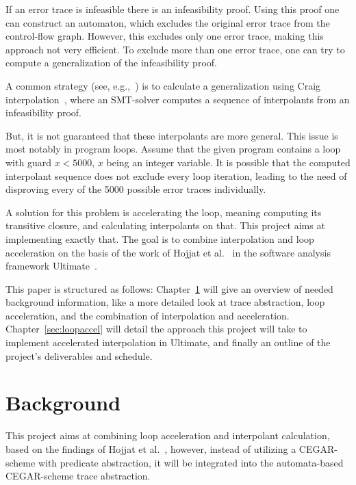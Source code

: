 \documentclass{article}
\newcommand\mycom[1]{}
\newcommand\mycom[1]{#1}
\newcommand{\dd}[1]{\mycom{\todo[color=orange!40,inline]{\small DD: #1}}}
\newcommand{\ts}[1]{\mycom{\todo[color=green!40,inline]{\small TS: #1}}}
\begin{document}
If an error trace is infeasible there is an infeasibility proof. \dd{what is an infeasibility proof? you can just write a half-sentence for that }
Using this proof one can construct an automaton, which excludes the original error trace from the control-flow graph. \dd{what does this automaton do? What language does it recognize?}
However, this excludes only one error trace, making this approach not very efficient. 
To exclude more than one error trace, one can try to compute a generalization of the infeasibility proof.

A common strategy (see, e.g.,~\cite{10.1007/978-3-642-03237-0_7}) is to calculate a generalization using Craig interpolation~\cite{craig_1957}, where an SMT-solver computes a sequence of interpolants from an infeasibility proof. \dd{and then?}

But, it is not guaranteed that these interpolants are more general. \dd{In general, yes, but this is usually not the issue. It is not guaranteed that they are general enough!}
This issue is most notably in program loops. 
Assume that the given program contains a loop with guard $x < 5000$, $x$ being an integer variable. 
It is possible that the computed interpolant sequence does not exclude every loop iteration, leading to the need of disproving every of the 5000 possible error traces individually. 
\dd{What is a interpolant sequence?}
\bigskip

A solution for this problem is accelerating the loop, meaning computing its transitive closure, and calculating interpolants on that.\ts{more precisely? (interpolants are not computed from the loop)} 
This project aims at implementing exactly that. 
The goal is to combine interpolation and loop acceleration on the basis of the work of Hojjat et al.~\cite{10.1007/978-3-642-33386-6_16} in the software analysis framework Ultimate~\cite{Zitat02}.

This paper is structured as follows:
Chapter~\ref{sec:background} will give an overview of needed background information, like a more detailed look at trace abstraction, loop acceleration, and the combination of interpolation and acceleration. 
Chapter~\ref{sec:loopaccel} will detail the approach this project will take to implement accelerated interpolation in Ultimate, and finally an outline of the project's deliverables and schedule.
\dd{first mention of ``accelerated interpolation'' -- perhaps introduce it explicitly by saying ``we call this combination \ldots''}

\section{Background}\label{sec:background}
This project aims at combining loop acceleration and interpolant calculation, based on the findings of Hojjat et al.~\cite{10.1007/978-3-642-33386-6_16}, however, instead of utilizing a CEGAR-scheme with predicate abstraction, it will be integrated into the automata-based CEGAR-scheme trace abstraction.
\end{document}

